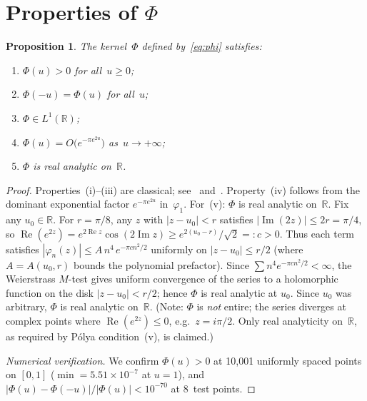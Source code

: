 \documentclass[11pt]{article}
\newtheorem{proposition}[theorem]{Proposition}
\theoremstyle{definition}
\theoremstyle{remark}
\begin{document}
\section{Properties of $\Phi$}
\label{sec:phi}

\begin{proposition}\label{prop:phi_properties}
The kernel~$\Phi$ defined by~\eqref{eq:phi} satisfies:
\begin{enumerate}[label=(\roman*)]
\item $\Phi(u) > 0$ for all~$u \geq 0$;
\item $\Phi(-u) = \Phi(u)$ for all~$u$;
\item $\Phi \in L^1(\mathbb{R})$;
\item $\Phi(u) = O\bigl(e^{-\pi e^{2u}}\bigr)$ as~$u \to +\infty$;
\item $\Phi$ is real analytic on~$\mathbb{R}$.
\end{enumerate}
\end{proposition}

\begin{proof}
Properties~(i)--(iii) are classical; see~\cite[\S2.10]{titchmarsh1986} and~\cite[Theorem~A]{csordas1989}. Property~(iv) follows from the dominant exponential factor $e^{-\pi e^{2u}}$ in~$\varphi_1$. For~(v): $\Phi$ is real analytic on~$\mathbb{R}$. Fix any $u_0\in\mathbb{R}$.
For $r = \pi/8$, any $z$ with $|z - u_0| < r$ satisfies $|\operatorname{Im}(2z)| \leq 2r = \pi/4$,
so $\operatorname{Re}(e^{2z}) = e^{2\operatorname{Re}z}\cos(2\operatorname{Im}z) \geq e^{2(u_0-r)}/\sqrt{2} =: c > 0$.
Thus each term satisfies $|\varphi_n(z)| \leq A\,n^4\,e^{-\pi c n^2/2}$ uniformly on $|z-u_0|\leq r/2$
(where $A = A(u_0,r)$ bounds the polynomial prefactor). Since $\sum n^4 e^{-\pi c n^2/2} < \infty$,
the Weierstrass $M$-test gives uniform convergence of the series to a holomorphic function
on the disk $|z-u_0| < r/2$; hence $\Phi$ is real analytic at $u_0$. Since $u_0$ was arbitrary,
$\Phi$ is real analytic on~$\mathbb{R}$. (Note: $\Phi$ is \emph{not} entire; the series
diverges at complex points where $\operatorname{Re}(e^{2z})\leq 0$, e.g.\ $z = i\pi/2$.
Only real analyticity on~$\mathbb{R}$, as required by P\'olya condition~(v), is claimed.)

\emph{Numerical verification.} We confirm $\Phi(u) > 0$ at 10{,}001 uniformly spaced points on $[0,1]$ ($\min = 5.51 \times 10^{-7}$ at $u = 1$), and $|\Phi(u) - \Phi(-u)|/|\Phi(u)| < 10^{-70}$ at 8~test points.
\end{proof}

\end{document}
